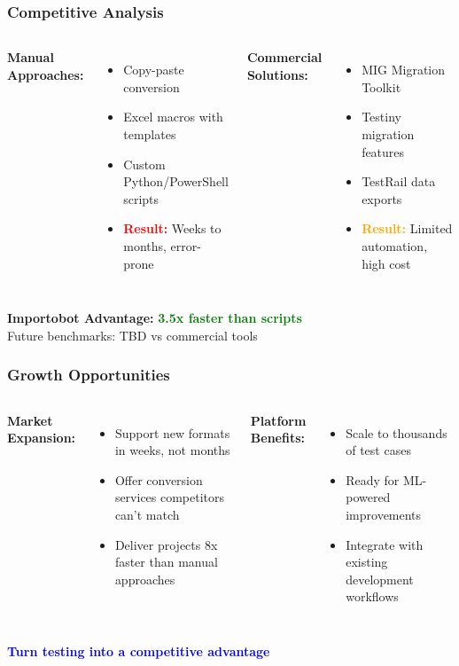 \begin{frame}
\frametitle{Competitive Analysis}
\begin{columns}
\textbf{Manual Approaches:}
{\footnotesize
\begin{itemize}
    \item Copy-paste conversion
    \item Excel macros with templates
    \item Custom Python/PowerShell scripts
    \item \textcolor{red}{\textbf{Result:}} Weeks to months, error-prone
\end{itemize}
}

\textbf{Commercial Solutions:}
{\footnotesize
\begin{itemize}
    \item MIG Migration Toolkit
    \item Testiny migration features
    \item TestRail data exports
    \item \textcolor{orange}{\textbf{Result:}} Limited automation, high cost
\end{itemize}
}
\end{columns}

\vspace{0.3cm}
\begin{center}
\textbf{Importobot Advantage:} {\normalsize\textcolor{green}{\textbf{3.5x faster than scripts}}}\\
{\footnotesize Future benchmarks: TBD vs commercial tools}
\end{center}
\end{frame}

\begin{frame}
\frametitle{Growth Opportunities}
\begin{columns}
\textbf{Market Expansion:}
{\footnotesize
\begin{itemize}
    \item Support new formats in weeks, not months
    \item Offer conversion services competitors can't match
    \item Deliver projects 8x faster than manual approaches
\end{itemize}
}

\textbf{Platform Benefits:}
{\footnotesize
\begin{itemize}
    \item Scale to thousands of test cases
    \item Ready for ML-powered improvements
    \item Integrate with existing development workflows
\end{itemize}
}
\end{columns}

\vspace{0.3cm}
\begin{center}
\textcolor{blue}{\textbf{Turn testing into a competitive advantage}}
\end{center}
\end{frame}


